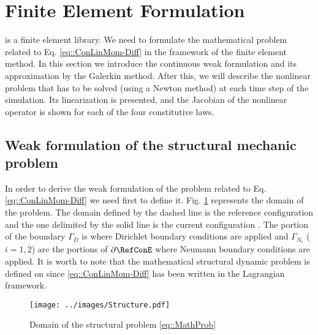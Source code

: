 \section{Finite Element Formulation}
\label{sct-FEF}
\LV is a finite element library. We need to formulate the mathematical problem related to Eq. \eqref{eq::ConLinMom-Diff} in the framework of the finite element method. In this section we introduce the continuous weak formulation and its approximation by the Galerkin method. After this, we will describe the nonlinear problem that has to be solved (using a Newton method) at each time step of the simulation. Its linearization is presented, and the Jacobian of the nonlinear operator is shown for each of the four constitutive laws.

\subsection{Weak formulation of the structural mechanic problem}
\label{sct-ContinuousWF}
In order to derive the weak formulation of the problem related to Eq. \eqref{eq::ConLinMom-Diff} we need first to define it. Fig. \ref{fig::Domain} represents the domain of the problem. The domain defined by the dashed line is the reference configuration \RefCon and the one delimited by the solid line is the current configuration \CurCon. The portion of the boundary $\Gamma _D$ is where Dirichlet boundary conditions are applied and $\Gamma_{N_i}$ ($i=1,2$) are the portions of $\partial \RefConE$ where Neumann boundary conditions are applied. It is worth to note that the mathematical structural dynamic problem is defined on \RefCon since \eqref{eq::ConLinMom-Diff} has been written in the Lagrangian framework.

\begin{figure}[h!]
  \centering
  \texttt{[image: ../images/Structure.pdf]}
  \caption{Domain of the structural problem \eqref{eq::MathProb}}
  \label{fig::Domain}
\end{figure}

